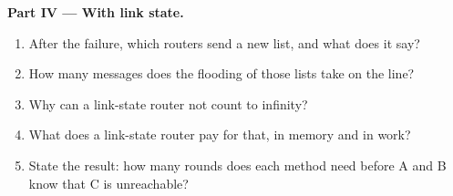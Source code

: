 \begin{problem}
\medskip\noindent\textbf{Part IV --- With link state.}
\begin{enumerate}[resume]
  \item After the failure, which routers send a new list, and what does it say?
  \item How many messages does the flooding of those lists take on the line?
  \item Why can a link-state router not count to infinity?
  \item What does a link-state router pay for that, in memory and in work?
  \item State the result: how many rounds does each method need before A and B know that C is unreachable?
\end{enumerate}
\end{problem}
